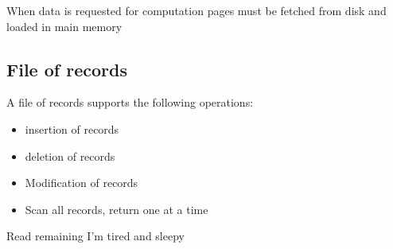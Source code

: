 \documentclass{article}
\begin{document}
When data is requested for computation pages must be fetched from disk and loaded in main memory

\subsection{File of records}
A file of records supports the following operations: \begin{itemize}
  \item insertion of records
  \item deletion of records
  \item Modification of records
  \item Scan all records, return one at a time
\end{itemize}

Read remaining I'm tired and sleepy
\end{document}
